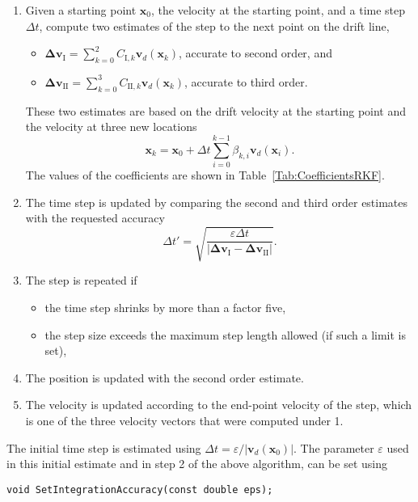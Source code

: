 \begin{enumerate}
  \item
  Given a starting point $\mathbf{x}_{0}$, the velocity at the starting point, 
  and a time step $\Delta{t}$, 
  compute two estimates of the step to the next point on the drift line, 
  \begin{itemize}
    \item
      $\boldsymbol{\Delta{v}}_{\text{I}} = \sum\limits_{k=0}^{2}C_{\text{I}, k}\mathbf{v}_{d}\left(\mathbf{x}_{k}\right)$, accurate to second order, and
    \item
      $\boldsymbol{\Delta{v}}_{\text{II}} = \sum\limits_{k=0}^{3}C_{\text{II}, k}\mathbf{v}_{d}\left(\mathbf{x}_{k}\right)$, accurate to third order.
  \end{itemize}
  These two estimates are based on the drift velocity at the starting point 
  and the velocity at three new locations
  \begin{equation*} 
  \mathbf{x}_{k} = \mathbf{x}_{0} + \Delta{t}\sum\limits_{i = 0}^{k - 1}\beta_{k,i}\mathbf{v}_{d}\left(\mathbf{x}_{i}\right).
  \end{equation*}
  The values of the coefficients are shown in Table~\ref{Tab:CoefficientsRKF}. 
  \item
  The time step is updated by comparing the second and third order estimates 
  with the requested accuracy
  \begin{equation*}
    \Delta{t}' = \sqrt{\frac{\varepsilon\Delta{t}}{\left|
      \boldsymbol{\Delta{v}}_{\text{I}} - \boldsymbol{\Delta{v}}_{\text{II}}\right|}}.
  \end{equation*}
  \item
  The step is repeated if
  \begin{itemize}
    \item
    the time step shrinks by more than a factor five,
    \item
    the step size exceeds the maximum step length allowed (if such a limit is set),
  \end{itemize}
  \item
  The position is updated with the second order estimate.
  \item
  The velocity is updated according to the end-point velocity of the step, 
  which is one of the three velocity vectors that were computed under 1.
\end{enumerate}
The initial time step is estimated using 
$\Delta{t} = \varepsilon / \left|\mathbf{v}_{d}\left(\mathbf{x}_{0}\right)\right|$.
The parameter $\varepsilon$ used in this initial estimate and in step 2 of the above 
algorithm, can be set using
\begin{lstlisting}
void SetIntegrationAccuracy(const double eps);
\end{lstlisting} 

